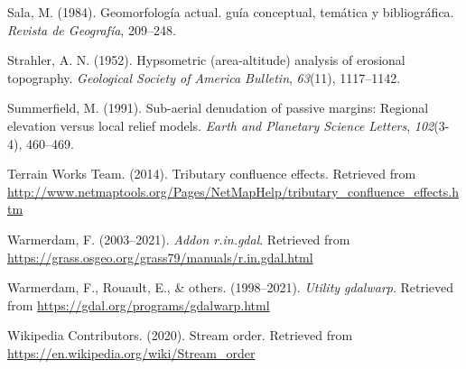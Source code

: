\documentclass[11pt,]{article}
\begin{document}
\hypertarget{ref-sala1984geomorfologia}{}
Sala, M. (1984). Geomorfología actual. guía conceptual, temática y
bibliográfica. \emph{Revista de Geografía}, 209--248.

\hypertarget{ref-strahler1952hypsometric}{}
Strahler, A. N. (1952). Hypsometric (area-altitude) analysis of
erosional topography. \emph{Geological Society of America Bulletin},
\emph{63}(11), 1117--1142.

\hypertarget{ref-summerfield1991sub}{}
Summerfield, M. (1991). Sub-aerial denudation of passive margins:
Regional elevation versus local relief models. \emph{Earth and Planetary
Science Letters}, \emph{102}(3-4), 460--469.

\hypertarget{ref-tributary}{}
Terrain Works Team. (2014). Tributary confluence effects. Retrieved from
\url{http://www.netmaptools.org/Pages/NetMapHelp/tributary_confluence_effects.htm}

\hypertarget{ref-ringdal}{}
Warmerdam, F. (2003--2021). \emph{Addon r.in.gdal}. Retrieved from
\url{https://grass.osgeo.org/grass79/manuals/r.in.gdal.html}

\hypertarget{ref-gdalwarp}{}
Warmerdam, F., Rouault, E., \& others. (1998--2021). \emph{Utility
gdalwarp}. Retrieved from \url{https://gdal.org/programs/gdalwarp.html}

\hypertarget{ref-wikipedia2020stream}{}
Wikipedia Contributors. (2020). Stream order. Retrieved from
\url{https://en.wikipedia.org/wiki/Stream_order}




\newpage
\singlespacing 
\end{document}
